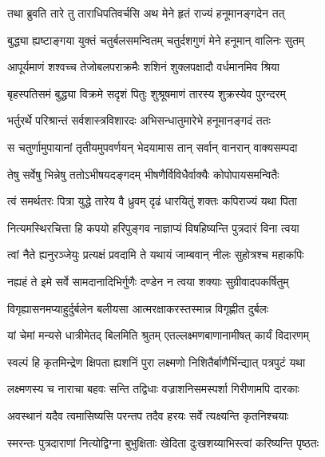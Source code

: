 
\twolineshloka
{तथा ब्रुवति तारे तु ताराधिपतिवर्चसि}
{अथ मेने हृतं राज्यं हनूमानङ्गदेन तत्} %

\twolineshloka
{बुद्ध्या ह्यष्टाङ्गया युक्तं चतुर्बलसमन्वितम्}
{चतुर्दशगुणं मेने हनूमान् वालिनः सुतम्} %

\twolineshloka
{आपूर्यमाणं शश्वच्च तेजोबलपराक्रमैः}
{शशिनं शुक्लपक्षादौ वर्धमानमिव श्रिया} %

\twolineshloka
{बृहस्पतिसमं बुद्ध्या विक्रमे सदृशं पितुः}
{शुश्रूषमाणं तारस्य शुक्रस्येव पुरन्दरम्} %

\twolineshloka
{भर्तुरर्थे परिश्रान्तं सर्वशास्त्रविशारदः}
{अभिसन्धातुमारेभे हनूमानङ्गदं ततः} %

\twolineshloka
{स चतुर्णामुपायानां तृतीयमुपवर्णयन्}
{भेदयामास तान् सर्वान् वानरान् वाक्यसम्पदा} %

\twolineshloka
{तेषु सर्वेषु भिन्नेषु ततोऽभीषयदङ्गदम्}
{भीषणैर्विविधैर्वाक्यैः कोपोपायसमन्वितैः} %

\twolineshloka
{त्वं समर्थतरः पित्रा युद्धे तारेय वै ध्रुवम्}
{दृढं धारयितुं शक्तः कपिराज्यं यथा पिता} %

\twolineshloka
{नित्यमस्थिरचित्ता हि कपयो हरिपुङ्गव}
{नाज्ञाप्यं विषहिष्यन्ति पुत्रदारं विना त्वया} %

\twolineshloka
{त्वां नैते ह्यनुरञ्जेयुः प्रत्यक्षं प्रवदामि ते}
{यथायं जाम्बवान् नीलः सुहोत्रश्च महाकपिः} %

\twolineshloka
{नह्यहं ते इमे सर्वे सामदानादिभिर्गुणैः}
{दण्डेन न त्वया शक्याः सुग्रीवादपकर्षितुम्} %

\twolineshloka
{विगृह्यासनमप्याहुर्दुर्बलेन बलीयसा}
{आत्मरक्षाकरस्तस्मान्न विगृह्णीत दुर्बलः} %

\twolineshloka
{यां चेमां मन्यसे धात्रीमेतद् बिलमिति श्रुतम्}
{एतल्लक्ष्मणबाणानामीषत् कार्यं विदारणम्} %

\twolineshloka
{स्वल्पं हि कृतमिन्द्रेण क्षिपता ह्यशनिं पुरा}
{लक्ष्मणो निशितैर्बाणैर्भिन्द्यात् पत्रपुटं यथा} %

\twolineshloka
{लक्ष्मणस्य च नाराचा बहवः सन्ति तद्विधाः}
{वज्राशनिसमस्पर्शा गिरीणामपि दारकाः} %

\twolineshloka
{अवस्थानं यदैव त्वमासिष्यसि परन्तप}
{तदैव हरयः सर्वे त्यक्ष्यन्ति कृतनिश्चयाः} %

\twolineshloka
{स्मरन्तः पुत्रदाराणां नित्योद्विग्ना बुभुक्षिताः}
{खेदिता दुःखशय्याभिस्त्वां करिष्यन्ति पृष्ठतः} %

